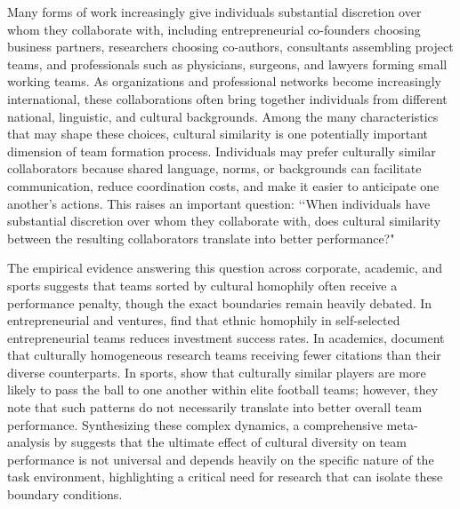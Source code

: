 \documentclass[10pt]{article}
\begin{document}
Many forms of work increasingly give individuals substantial discretion over whom they collaborate with, including entrepreneurial co-founders choosing business partners, researchers choosing co-authors, consultants assembling project teams, and professionals such as physicians, surgeons, and lawyers forming small working teams. %
As organizations and professional networks become increasingly international, these collaborations often bring together individuals from different national, linguistic, and cultural backgrounds. Among the many characteristics that may shape these choices, cultural similarity is one potentially important dimension of team formation process. Individuals may prefer culturally similar collaborators because shared language, norms, or backgrounds can facilitate communication, reduce coordination costs, and make it easier to anticipate one another's actions. %
This raises an important question: \lq\lq When individuals have substantial discretion over whom they collaborate with,  does cultural similarity between the resulting collaborators translate into better performance?" 

The empirical evidence answering this question across corporate, academic, and sports suggests that teams sorted by cultural homophily often receive a performance penalty, though the exact boundaries remain heavily debated. In entrepreneurial and ventures, \citet{gompersetal2016} find that ethnic homophily in self-selected entrepreneurial teams reduces investment success rates. In academics, \citet{freemanhuang2015} document  that culturally homogeneous research teams  receiving fewer citations than their diverse counterparts. In sports, \citet{bekesottaviano2025} show that culturally similar players are more likely to pass the ball to one another within elite football teams; however, they note that such patterns do not necessarily translate into better overall team performance. Synthesizing these complex dynamics, a comprehensive meta-analysis by \citet{stahl2010} suggests that the ultimate effect of cultural diversity on team performance is not universal and depends heavily on the specific nature of the task environment, highlighting a critical need for research that can isolate these boundary conditions.
\end{document}
